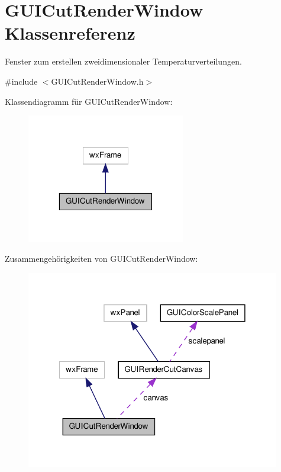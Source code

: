 \hypertarget{classGUICutRenderWindow}{\section{G\-U\-I\-Cut\-Render\-Window Klassenreferenz}
\label{classGUICutRenderWindow}
}


Fenster zum erstellen zweidimensionaler Temperaturverteilungen.  




{\ttfamily \#include $<$G\-U\-I\-Cut\-Render\-Window.\-h$>$}



Klassendiagramm für G\-U\-I\-Cut\-Render\-Window\-:\nopagebreak
\begin{figure}[H]
\begin{center}
\leavevmode
\includegraphics[width=196pt]{classGUICutRenderWindow__inherit__graph}
\end{center}
\end{figure}


Zusammengehörigkeiten von G\-U\-I\-Cut\-Render\-Window\-:\nopagebreak
\begin{figure}[H]
\begin{center}
\leavevmode
\includegraphics[width=314pt]{classGUICutRenderWindow__coll__graph}
\end{center}
\end{figure}
